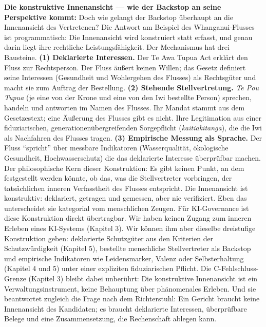 \documentclass[acmlarge, noacm]{acmart}
\begin{document}
\noindent\textbf{Die konstruktive Innenansicht --- wie der Backstop an seine Perspektive kommt:} Doch wie gelangt der Backstop überhaupt an die Innenansicht des Vertretenen? Die Antwort am Beispiel des Whanganui-Flusses ist programmatisch: Die Innenansicht wird konstruiert statt erfasst, und genau darin liegt ihre rechtliche Leistungsfähigkeit. Der Mechanismus hat drei Bausteine. \textbf{(1) Deklarierte Interessen.} Der Te Awa Tupua Act erklärt den Fluss zur Rechtsperson. Der Fluss äußert keinen Willen; das Gesetz definiert seine Interessen (Gesundheit und Wohlergehen des Flusses) als Rechtsgüter und macht sie zum Auftrag der Bestellung. \textbf{(2) Stehende Stellvertretung.} \textit{Te Pou Tupua} (je eine von der Krone und eine von den Iwi bestellte Person) sprechen, handeln und antworten im Namen des Flusses. Ihr Mandat stammt aus dem Gesetzestext; eine Äußerung des Flusses gibt es nicht. Ihre Legitimation aus einer fiduziarischen, generationenübergreifenden Sorgepflicht (\textit{kaitiakitanga}), die die Iwi als Nachfahren des Flusses tragen. \textbf{(3) Empirische Messung als Sprache.} Der Fluss ``spricht'' über messbare Indikatoren (Wasserqualität, ökologische Gesundheit, Hochwasserschutz) die das deklarierte Interesse überprüfbar machen. Der philosophische Kern dieser Konstruktion: Es gibt keinen Punkt, an dem festgestellt werden könnte, ob das, was die Stellvertreter vorbringen, der tatsächlichen inneren Verfasstheit des Flusses entspricht. Die Innenansicht ist konstruktiv: deklariert, getragen und gemessen, aber nie verifiziert. Eben das unterscheidet sie kategorial vom menschlichen Zeugen. Für KI-Governance ist diese Konstruktion direkt übertragbar. Wir haben keinen Zugang zum inneren Erleben eines KI-Systems (Kapitel 3). Wir können ihm aber dieselbe dreistufige Konstruktion geben: deklarierte Schutzgüter aus den Kriterien der Schutzwürdigkeit (Kapitel 5), bestellte menschliche Stellvertreter als Backstop und empirische Indikatoren wie Leidensmarker, Valenz oder Selbsterhaltung (Kapitel 4 und 5) unter einer expliziten fiduziarischen Pflicht. Die C-Fehlschluss-Grenze (Kapitel 3) bleibt dabei unberührt: Die konstruktive Innenansicht ist ein Verwaltungsinstrument, keine Behauptung über phänomenales Erleben. Und sie beantwortet zugleich die Frage nach dem Richterstuhl: Ein Gericht braucht keine Innenansicht des Kandidaten; es braucht deklarierte Interessen, überprüfbare Belege und eine Zusammensetzung, die Rechenschaft ablegen kann.
\end{document}
